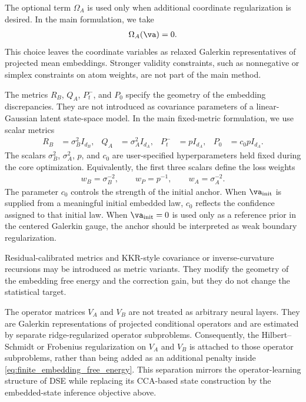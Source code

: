 \documentclass[twoside,11pt]{article}
\begin{document}
The optional term $\Omega_A$ is used only when additional coordinate
regularization is desired. In the main formulation, we take
\begin{align}
\Omega_A(\va)=0.
\label{eq:default_omega_A_zero}
\end{align}
This choice leaves the coordinate variables as relaxed Galerkin
representatives of projected mean embeddings. Stronger validity
constraints, such as nonnegative or simplex constraints on atom weights,
are not part of the main method.

The metrics $R_B$, $Q_A$, $P_t^-$, and $P_0$ specify the geometry of
the embedding discrepancies. They are not introduced as covariance
parameters of a linear-Gaussian latent state-space model. In the main
fixed-metric formulation, we use scalar metrics
\begin{align}
R_B
&=
\sigma_B^2 I_{d_B},
&
Q_A
&=
\sigma_A^2 I_{d_A},
&
P_t^-
&=
p I_{d_A},
&
P_0
&=
c_0p I_{d_A}.
\label{eq:fixed_scalar_metrics}
\end{align}
The scalars $\sigma_B^2$, $\sigma_A^2$, $p$, and $c_0$ are
user-specified hyperparameters held fixed during the core optimization.
Equivalently, the first three scalars define the loss weights
\begin{align}
w_B
=
\sigma_B^{-2},
\qquad
w_P
=
p^{-1},
\qquad
w_A
=
\sigma_A^{-2}.
\label{eq:fixed_metric_loss_weights}
\end{align}
The parameter $c_0$ controls the strength of the initial anchor. When
$\va_{\mathrm{init}}$ is supplied from a meaningful initial embedded
law, $c_0$ reflects the confidence assigned to that initial law. When
$\va_{\mathrm{init}}=0$ is used only as a reference prior in the
centered Galerkin gauge, the anchor should be interpreted as weak
boundary regularization.

Residual-calibrated metrics and KKR-style covariance or
inverse-curvature recursions may be introduced as metric variants. They
modify the geometry of the embedding free energy and the correction
gain, but they do not change the statistical target.

The operator matrices $V_A$ and $V_B$ are not treated as arbitrary
neural layers. They are Galerkin representations of projected
conditional operators and are estimated by separate ridge-regularized
operator subproblems. Consequently, the Hilbert--Schmidt or Frobenius
regularization on $V_A$ and $V_B$ is attached to those operator
subproblems, rather than being added as an additional penalty inside
\eqref{eq:finite_embedding_free_energy}. This separation mirrors the
operator-learning structure of DSE while replacing its CCA-based state
construction by the embedded-state inference objective above.
\end{document}
